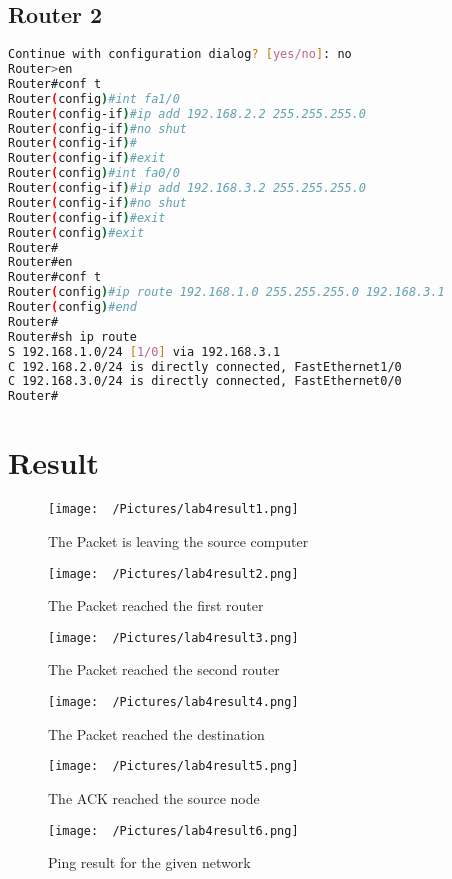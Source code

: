 \documentclass{article}
\begin{document}
\subsection{Router 2}
\begin{lstlisting}[language=bash]
Continue with configuration dialog? [yes/no]: no
Router>en
Router#conf t
Router(config)#int fa1/0
Router(config-if)#ip add 192.168.2.2 255.255.255.0
Router(config-if)#no shut
Router(config-if)#
Router(config-if)#exit
Router(config)#int fa0/0
Router(config-if)#ip add 192.168.3.2 255.255.255.0
Router(config-if)#no shut
Router(config-if)#exit
Router(config)#exit
Router#
Router#en
Router#conf t
Router(config)#ip route 192.168.1.0 255.255.255.0 192.168.3.1
Router(config)#end
Router#
Router#sh ip route
S 192.168.1.0/24 [1/0] via 192.168.3.1
C 192.168.2.0/24 is directly connected, FastEthernet1/0
C 192.168.3.0/24 is directly connected, FastEthernet0/0
Router#
\end{lstlisting}

\section{Result}
\begin{figure}[H]
    \centering
    \texttt{[image: ~/Pictures/lab4result1.png]}
    \caption{The Packet is leaving the source computer}
\end{figure}
\begin{figure}[H]
    \centering
    \texttt{[image: ~/Pictures/lab4result2.png]}
    \caption{The Packet reached the first router}
\end{figure}
\begin{figure}[H]
    \centering
    \texttt{[image: ~/Pictures/lab4result3.png]}
    \caption{The Packet reached the second router}
\end{figure}
\begin{figure}[H]
    \centering
    \texttt{[image: ~/Pictures/lab4result4.png]}
    \caption{The Packet reached the destination}
\end{figure}
\begin{figure}[H]
    \centering
    \texttt{[image: ~/Pictures/lab4result5.png]}
    \caption{The ACK reached the source node}
\end{figure}
\begin{figure}[H]
    \centering
    \texttt{[image: ~/Pictures/lab4result6.png]}
    \caption{Ping result for the given network}
\end{figure}
\end{document}
